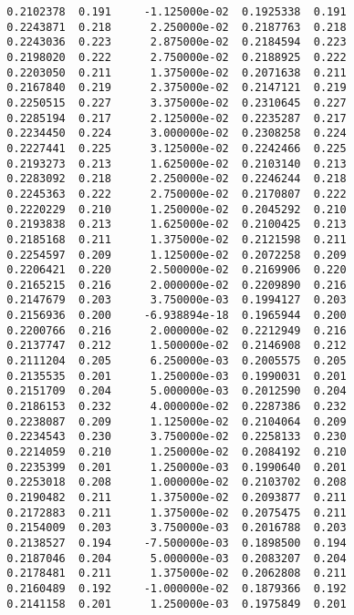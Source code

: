 \documentclass[
  letterpaper,
  DIV=11,
  numbers=noendperiod]{scrartcl}
\begin{document}
\begin{verbatim}
  0.2102378  0.191     -1.125000e-02  0.1925338  0.191           
  0.2243871  0.218      2.250000e-02  0.2187763  0.218           
  0.2243036  0.223      2.875000e-02  0.2184594  0.223           
  0.2198020  0.222      2.750000e-02  0.2188925  0.222           
  0.2203050  0.211      1.375000e-02  0.2071638  0.211           
  0.2167840  0.219      2.375000e-02  0.2147121  0.219           
  0.2250515  0.227      3.375000e-02  0.2310645  0.227           
  0.2285194  0.217      2.125000e-02  0.2235287  0.217           
  0.2234450  0.224      3.000000e-02  0.2308258  0.224           
  0.2227441  0.225      3.125000e-02  0.2242466  0.225           
  0.2193273  0.213      1.625000e-02  0.2103140  0.213           
  0.2283092  0.218      2.250000e-02  0.2246244  0.218           
  0.2245363  0.222      2.750000e-02  0.2170807  0.222           
  0.2220229  0.210      1.250000e-02  0.2045292  0.210           
  0.2193838  0.213      1.625000e-02  0.2100425  0.213           
  0.2185168  0.211      1.375000e-02  0.2121598  0.211           
  0.2254597  0.209      1.125000e-02  0.2072258  0.209           
  0.2206421  0.220      2.500000e-02  0.2169906  0.220           
  0.2165215  0.216      2.000000e-02  0.2209890  0.216           
  0.2147679  0.203      3.750000e-03  0.1994127  0.203           
  0.2156936  0.200     -6.938894e-18  0.1965944  0.200           
  0.2200766  0.216      2.000000e-02  0.2212949  0.216           
  0.2137747  0.212      1.500000e-02  0.2146908  0.212           
  0.2111204  0.205      6.250000e-03  0.2005575  0.205           
  0.2135535  0.201      1.250000e-03  0.1990031  0.201           
  0.2151709  0.204      5.000000e-03  0.2012590  0.204           
  0.2186153  0.232      4.000000e-02  0.2287386  0.232           
  0.2238087  0.209      1.125000e-02  0.2104064  0.209           
  0.2234543  0.230      3.750000e-02  0.2258133  0.230           
  0.2214059  0.210      1.250000e-02  0.2084192  0.210           
  0.2235399  0.201      1.250000e-03  0.1990640  0.201           
  0.2253018  0.208      1.000000e-02  0.2103702  0.208           
  0.2190482  0.211      1.375000e-02  0.2093877  0.211           
  0.2172883  0.211      1.375000e-02  0.2075475  0.211           
  0.2154009  0.203      3.750000e-03  0.2016788  0.203           
  0.2138527  0.194     -7.500000e-03  0.1898500  0.194           
  0.2187046  0.204      5.000000e-03  0.2083207  0.204           
  0.2178481  0.211      1.375000e-02  0.2062808  0.211           
  0.2160489  0.192     -1.000000e-02  0.1879366  0.192           
  0.2141158  0.201      1.250000e-03  0.1975849  0.201           

\end{verbatim}
\end{document}
